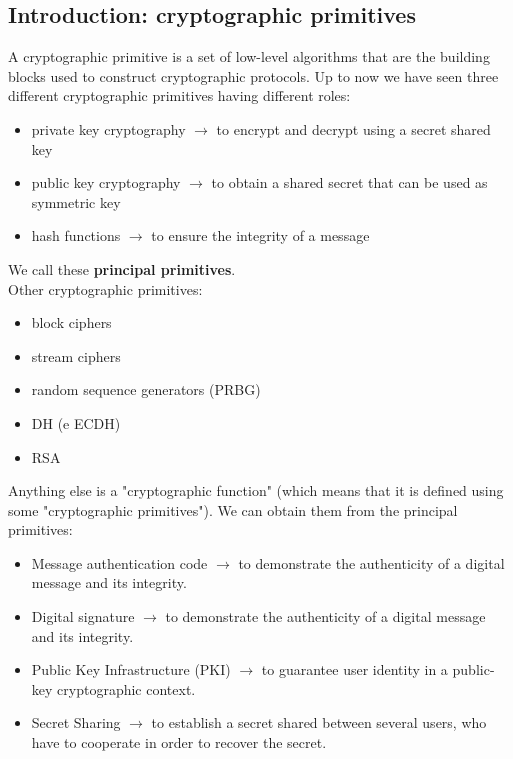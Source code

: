 \documentclass[a4paper, 10pt, titlepage]{article}
\begin{document}
\subsection{Introduction: cryptographic primitives}
A cryptographic primitive is a set of low-level algorithms that are the building blocks used to construct cryptographic protocols. Up to now we have seen three different cryptographic primitives having different roles:
\begin{itemize}
\item private key cryptography $\rightarrow$ to encrypt and decrypt using a secret shared key
\item public key cryptography $\rightarrow$ to obtain a shared secret that can be used as symmetric key
\item hash functions $\rightarrow$ to ensure the integrity of a message 
\end{itemize}
We call these \textbf{principal primitives}. \\
Other cryptographic primitives:
\begin{itemize}
\item block ciphers
\item stream ciphers
\item random sequence generators (PRBG)
\item DH (e ECDH)
\item RSA
\end{itemize}
Anything else is a "cryptographic function" (which means that it is defined using some "cryptographic primitives").
We can obtain them from the principal primitives:
\begin{itemize}
\item Message authentication code $\rightarrow$ to demonstrate the authenticity of a digital message and its integrity.
\item Digital signature $\rightarrow$ to demonstrate the authenticity of a digital message and its integrity.
\item Public Key Infrastructure (PKI) $\rightarrow$ to guarantee user identity in a public-key cryptographic context.
\item Secret Sharing $\rightarrow$ to establish a secret shared between several users, who have to cooperate in order to recover the secret.
\end{itemize}

\newpage
\end{document}
